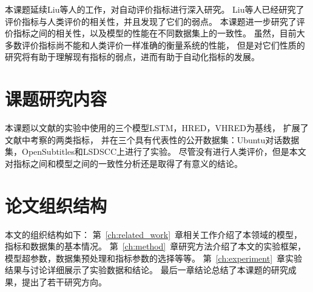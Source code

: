 本课题延续Liu等人的工作，对自动评价指标进行深入研究。
Liu等人已经研究了评价指标与人类评价的相关性，并且发现了它们的弱点。
本课题进一步研究了评价指标之间的相关性，以及模型的性能在不同数据集上的一致性。
虽然，目前大多数评价指标尚不能和人类评价一样准确的衡量系统的性能，
但是对它们性质的研究将有助于理解现有指标的弱点，进而有助于自动化指标的发展。

\section{课题研究内容}\label{sec:reseach_content}
本课题以文献\cite{VHRED}的实验中使用的三个模型LSTM，HRED，VHRED为基线，
扩展了文献\cite{HowNot}中考察的两类指标，
并在三个具有代表性的公开数据集：Ubuntu对话数据集，OpenSubtitles和LSDSCC上进行了实验。
尽管没有进行人类评价，但是本文对指标之间和模型之间的一致性分析还是取得了有意义的结论。

\section{论文组织结构}\label{sec:paper_organization}
本文的组织结构如下：
第~\ref{ch:related_work}~章相关工作介绍了本领域的模型，指标和数据集的基本情况。
第~\ref{ch:method}~章研究方法介绍了本文的实验框架，模型超参数，数据集预处理和指标参数的选择等等。
第~\ref{ch:experiment}~章实验结果与讨论详细展示了实验数据和结论。
最后一章结论总结了本课题的研究成果，提出了若干研究方向。

